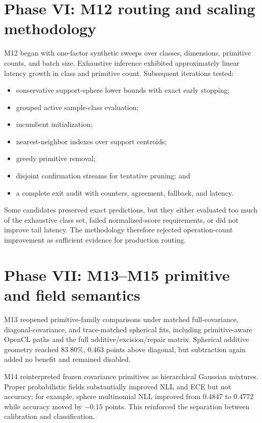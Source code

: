 \documentclass[12pt,oneside]{report}
\begin{document}
\section{Phase VI: M12 routing and scaling methodology}

M12 began with one-factor synthetic sweeps over classes, dimensions, primitive
counts, and batch size. Exhaustive inference exhibited approximately linear
latency growth in class and primitive count. Subsequent iterations tested:

\begin{itemize}
\item conservative support-sphere lower bounds with exact early stopping;
\item grouped active sample-class evaluation;
\item incumbent initialization;
\item nearest-neighbor indexes over support centroids;
\item greedy primitive removal;
\item disjoint confirmation streams for tentative pruning; and
\item a complete exit audit with counters, agreement, fallback, and latency.
\end{itemize}

Some candidates preserved exact predictions, but they either evaluated too
much of the exhaustive class set, failed normalized-score requirements, or did
not improve tail latency. The methodology therefore rejected operation-count
improvement as sufficient evidence for production routing.

\section{Phase VII: M13--M15 primitive and field semantics}

M13 reopened primitive-family comparisons under matched full-covariance,
diagonal-covariance, and trace-matched spherical fits, including
primitive-aware OpenCL paths and the full additive/excision/repair matrix.
Spherical additive geometry reached 83.80\%, 0.463 points above diagonal, but
subtraction again added no benefit and remained disabled.

M14 reinterpreted frozen covariance primitives as hierarchical Gaussian
mixtures. Proper probabilistic fields substantially improved NLL and ECE but
not accuracy; for example, sphere multinomial NLL improved from 0.4847 to
0.4772 while accuracy moved by $-0.15$ points. This reinforced the separation
between calibration and classification.
\end{document}
